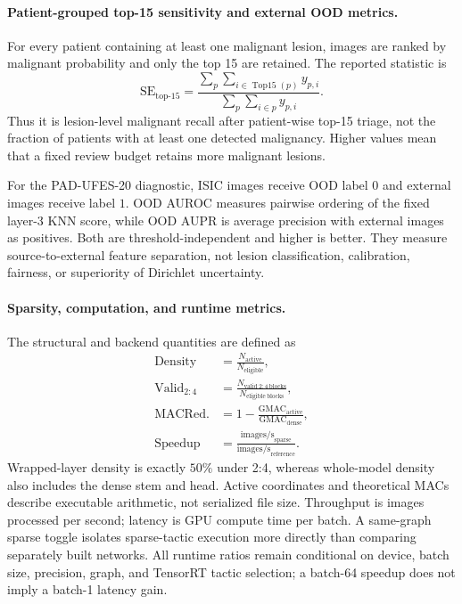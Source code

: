 \documentclass[letterpaper]{article}
\begin{document}
\paragraph{Patient-grouped top-15 sensitivity and external OOD metrics.}
For every patient containing at least one malignant lesion, images are ranked by
malignant probability and only the top 15 are retained. The reported statistic
is
\begin{equation}\label{eq:appendix_top15}
\mathrm{SE}_{\mathrm{top\text{-}15}}
=\frac{\displaystyle\sum_{p}\sum_{i\in\operatorname{Top15}(p)}y_{p,i}}
{\displaystyle\sum_{p}\sum_{i\in p}y_{p,i}}.
\end{equation}
Thus it is lesion-level malignant recall after patient-wise top-15 triage, not
the fraction of patients with at least one detected malignancy. Higher values
mean that a fixed review budget retains more malignant lesions.

For the PAD-UFES-20 diagnostic, ISIC images receive OOD label $0$ and external
images receive label $1$. OOD AUROC measures pairwise ordering of the fixed
layer-3 KNN score, while OOD AUPR is average precision with external images as
positives. Both are threshold-independent and higher is better. They measure
source-to-external feature separation, not lesion classification, calibration,
fairness, or superiority of Dirichlet uncertainty.

\paragraph{Sparsity, computation, and runtime metrics.}
The structural and backend quantities are defined as
\begin{equation}\label{eq:appendix_hardware_metrics}
\begin{aligned}
\mathrm{Density}&=\frac{N_{\mathrm{active}}}{N_{\mathrm{eligible}}},\\
\mathrm{Valid}_{2:4}&=\frac{N_{\mathrm{valid\ 2:4\ blocks}}}
{N_{\mathrm{eligible\ blocks}}},\\
\mathrm{MACRed.}&=1-\frac{\mathrm{GMAC}_{\mathrm{active}}}
{\mathrm{GMAC}_{\mathrm{dense}}},\\
\mathrm{Speedup}&=\frac{\mathrm{images/s}_{\mathrm{sparse}}}
{\mathrm{images/s}_{\mathrm{reference}}}.
\end{aligned}
\end{equation}
Wrapped-layer density is exactly $50\%$ under 2:4, whereas whole-model density
also includes the dense stem and head. Active coordinates and theoretical MACs
describe executable arithmetic, not serialized file size. Throughput is images
processed per second; latency is GPU compute time per batch. A same-graph sparse
toggle isolates sparse-tactic execution more directly than comparing separately
built networks. All runtime ratios remain conditional on device, batch size,
precision, graph, and TensorRT tactic selection; a batch-64 speedup does not
imply a batch-1 latency gain.
\end{document}
